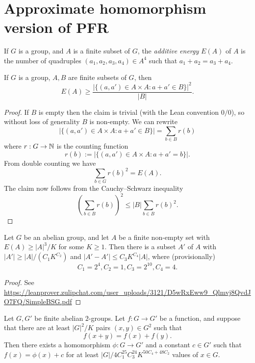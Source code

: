 \chapter{Approximate homomorphism version of PFR}

\begin{definition}\label{energy-def}\leanok  If $G$ is a group, and $A$ is a finite subset of $G$, the \emph{additive energy} $E(A)$ of $A$ is the number of quadruples $(a_1,a_2,a_3,a_4) \in A^4$ such that $a_1+a_2 = a_3+a_4$.
\end{definition}

\begin{lemma}\label{cs-bound}\leanok  If $G$ is a group, $A,B$ are finite subsets of $G$, then
$$ E(A) \geq \frac{|\{ (a,a') \in A \times A: a+a' \in B \}|^2}{|B|}.$$
\end{lemma}

\begin{proof}  If $B$ is empty then the claim is trivial (with the Lean convention $0/0$), so without loss of generality $B$ is non-empty.  We can rewrite
$$ |\{ (a,a') \in A \times A: a+a' \in B \}| = \sum_{b \in B} r(b)$$
where $r: G \to \mathbb{N}$ is the counting function
$$ r(b) := |\{ (a,a') \in A \times A: a+a' = b \}|.$$
From double counting we have
$$ \sum_{b \in G} r(b)^2 = E(A).$$
The claim now follows from the Cauchy--Schwarz inequality
$$ (\sum_{b \in B} r(b))^2 \leq |B| \sum_{b \in B} r(b)^2.$$
\end{proof}

\begin{lemma}\label{bsg}\leanok Let $G$ be an abelian group, and let $A$ be a finite non-empty set with $E(A) \geq |A|^3 / K$ for some $K \geq 1$.  Then there is a subset $A'$ of $A$ with $|A'| \geq |A| / (C_1 K^{C_2})$ and $|A'-A'| \leq C_3 K^{C_4} |A|$, where (provisionally)
$$ C_1 = 2^4, C_2 = 1, C_3 = 2^{10}, C_4 = 4.$$
\end{lemma}

\begin{proof} See \url{https://leanprover.zulipchat.com/user_uploads/3121/D5wRxEww9_Qlmvj8QvdJO7FQ/SimpleBSG.pdf}
\end{proof}

\begin{theorem}\label{approx-hom-pfr}\leanok Let $G,G'$ be finite abelian $2$-groups.
  Let $f: G \to G'$ be a function, and suppose that there are at least $|G|^2 / K$ pairs $(x,y) \in G^2$ such that
$$ f(x+y) = f(x) + f(y).$$
Then there exists a homomorphism $\phi: G \to G'$ and a constant $c \in G'$ such that $f(x) = \phi(x)+c$ for at least $|G| / 4C_1^{25} C_3^{24} K^{50C_4+48 C_2}$ values of $x \in G$.
\end{theorem}

